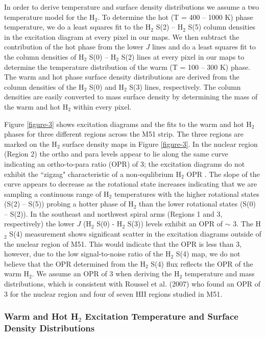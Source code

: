 \documentclass[manuscript]{aastex}
\begin{document}
In order to derive temperature and surface density 
distributions we assume a two temperature model for the 
H$_2$.  To determine the hot (T = 400 -- 1000 K) 
phase temperature, we do a least squares fit 
to the H$_2$ S(2) -- H$_2$ S(5) column densities in the 
excitation diagram at every pixel in our maps.   
We then subtract the contribution of the hot phase from the lower $J$ 
lines and do a least squares fit to the column densities of 
H$_2$ S(0) -- H$_2$ S(2) lines at every pixel in our 
maps to determine the temperature distribution 
of the warm (T = 100 -- 300 K) phase.  The warm and hot 
phase surface density distributions are derived from the 
column densities of the H$_2$ S(0) and H$_2$ S(3) lines, 
respectively.  The column densities are easily converted 
to mass surface density by determining the mass of the 
warm and hot H$_2$ within every pixel. 

Figure \ref{figure-3} shows excitation diagrams and the 
fits to the warm and hot H$_2$ phases for three
different regions across the M51 strip.  The three 
regions are marked on the H$_2$ surface density 
maps in Figure \ref{figure-3}.  In the nuclear region 
(Region 2) the ortho and para levels appear to lie along the 
same curve indicating an ortho-to-para ratio (OPR) of 3; 
the excitation diagrams do not exhibit the ``zigzag" characteristic of a 
non-equlibrium H$_2$ OPR \citep{neu98, fue99}.  The 
slope of the curve appears to decrease as the rotational 
state increases indicating that we are sampling a continuous 
range of H$_2$ temperatures with the higher rotational 
states (S(2) -- S(5)) probing a hotter phase of H$_2$ 
than the lower rotational states (S(0) -- S(2)).  In the 
southeast and northwest spiral arms (Regions 1 and 
3, respectively) the lower $J$ (H$_2$ S(0) - 
H$_2$ S(3)) levels exhibit an OPR of $\sim$ 3.  The 
H$_2$ S(4) measurement shows significant 
scatter in the excitation diagrams outside of the nuclear 
region of M51.  This would indicate that the OPR is 
less than 3, however, due to the low signal-to-noise 
ratio of the H$_2$ S(4) map, we do not 
believe that the OPR determined from the H$_2$ 
S(4) flux reflects the OPR of the warm H$_2$. 
We assume an OPR of 3 when deriving the H$_2$ 
temperature and mass distributions, which is consistent 
with Roussel et al. (2007) who found an OPR of 3  for the 
nuclear region and four of seven HII regions studied in M51.

\subsubsection{Warm and Hot H$_2$ Excitation Temperature and Surface Density Distributions}
\end{document}
